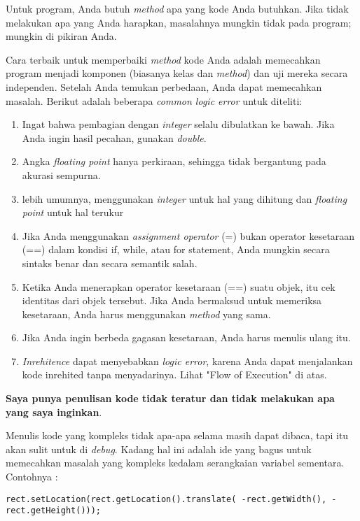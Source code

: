 \noindent Untuk program, Anda butuh \textit{method} apa yang kode Anda butuhkan. Jika tidak melakukan apa yang Anda harapkan, masalahnya mungkin tidak pada program; mungkin di pikiran Anda.

Cara terbaik untuk memperbaiki \textit{method} kode Anda adalah memecahkan program menjadi komponen (biasanya kelas dan \textit{method}) dan uji mereka secara independen. Setelah Anda temukan perbedaan, Anda dapat memecahkan masalah.
Berikut adalah beberapa \textit{common logic error} untuk diteliti:
\begin{enumerate}
    \item Ingat bahwa pembagian dengan \textit{integer} selalu dibulatkan ke bawah. Jika Anda ingin hasil pecahan, gunakan \textit{double}.
    \item Angka \textit{floating point} hanya perkiraan, sehingga tidak bergantung pada akurasi sempurna.
    \item lebih umumnya, menggunakan \textit{integer} untuk hal yang dihitung dan \textit{floating point} untuk hal terukur
    \item Jika Anda menggunakan \textit{assignment operator} (=) bukan operator kesetaraan (==) dalam kondisi if, while, atau for statement, Anda mungkin secara sintaks benar dan secara semantik salah.
    \item Ketika Anda menerapkan operator kesetaraan (==) suatu objek, itu cek identitas dari objek tersebut. Jika Anda bermaksud untuk memeriksa kesetaraan, Anda harus menggunakan \textit{method} yang sama.
    \item Jika Anda ingin berbeda gagasan kesetaraan, Anda harus menulis ulang itu.
    \item \textit{Inrehitence} dapat menyebabkan \textit{logic error}, karena Anda dapat menjalankan kode inrehited tanpa menyadarinya. Lihat "Flow of Execution" di atas.
\end{enumerate}

\noindent \textbf{Saya punya penulisan kode tidak teratur dan tidak melakukan apa yang saya inginkan}.

\noindent Menulis kode yang kompleks tidak apa-apa selama masih dapat dibaca, tapi itu akan sulit untuk di \textit{debug}. Kadang hal ini adalah ide yang bagus untuk memecahkan masalah yang kompleks kedalam serangkaian variabel sementara.
Contohnya :
\begin{lstlisting}
rect.setLocation(rect.getLocation().translate( -rect.getWidth(), -rect.getHeight()));
\end{lstlisting}

